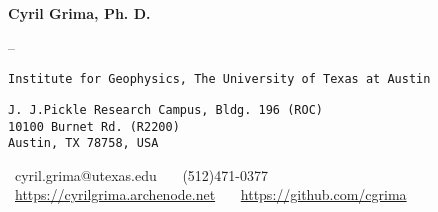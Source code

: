 \begin{center}

{\LARGE \textbf{Cyril Grima, Ph. D.}}
\vspace{.5em}

\hspace{0pt}{\large Research Associate}

--

\noindent\hspace{0pt}\texttt{Institute for Geophysics, The University of Texas at Austin}

\noindent\hspace{0pt}\texttt{J. J.Pickle Research Campus, Bldg. 196 (ROC)\\10100 Burnet Rd. (R2200)\\Austin, TX 78758, USA}
\vspace{.5em}

\noindent\hspace{0pt}\faInbox \ cyril.grima@utexas.edu \ \ \faPhone \ (512)471-0377 \\
\faDesktop \ \href{https://cyrilgrima.archenode.net}{https://cyrilgrima.archenode.net} \ \ \faGithub \ \href{https://github.com/cgrima}{https://github.com/cgrima}
\end{center}
\vspace{-1em}